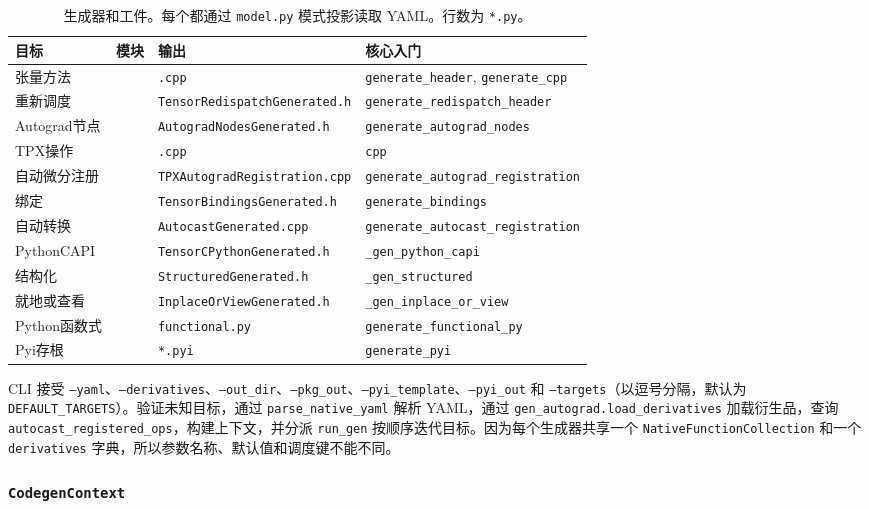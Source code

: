 \begin{table}[H]
\centering
\caption{生成器和工件。每个都通过 \texttt{model.py} 模式投影读取 YAML。行数为 \texttt{*.py}。}
\label{tab:codegen_generators}
\small
\begin{tabular}{llll}
\toprule
目标 & 模块 & 输出 & 核心入门 \\
\midrule
张量方法 &  & \texttt{.cpp} & \texttt{generate\_header}, \texttt{generate\_cpp} \\
重新调度 &  & \texttt{TensorRedispatchGenerated.h} & \texttt{generate\_redispatch\_header} \\
Autograd节点 &  & \texttt{AutogradNodesGenerated.h} & \texttt{generate\_autograd\_nodes} \\
TPX操作 &  & \texttt{.cpp} & \texttt{cpp} \\
自动微分注册 &  & \texttt{TPXAutogradRegistration.cpp} & \texttt{generate\_autograd\_registration} \\
绑定 &  & \texttt{TensorBindingsGenerated.h} & \texttt{generate\_bindings} \\
自动转换 &  & \texttt{AutocastGenerated.cpp} & \texttt{generate\_autocast\_registration} \\
PythonCAPI &  & \texttt{TensorCPythonGenerated.h} & \texttt{\_gen\_python\_capi} \\
结构化 &  & \texttt{StructuredGenerated.h} & \texttt{\_gen\_structured} \\
就地或查看 &  & \texttt{InplaceOrViewGenerated.h} & \texttt{\_gen\_inplace\_or\_view} \\
Python函数式 &  & \texttt{functional.py} & \texttt{generate\_functional\_py} \\
Pyi存根 &  & \texttt{*.pyi} & \texttt{generate\_pyi} \\
\bottomrule
\end{tabular}
\end{table}

CLI 接受 \texttt{--yaml}、\texttt{--derivatives}、\texttt{--out\_dir}、\texttt{--pkg\_out}、\texttt{--pyi\_template}、\texttt{--pyi\_out} 和 \texttt{--targets}（以逗号分隔，默认为 \texttt{DEFAULT\_TARGETS}）。验证未知目标，通过 \texttt{parse\_native\_yaml} 解析 YAML，通过 \texttt{gen\_autograd.load\_derivatives} 加载衍生品，查询 \texttt{autocast\_registered\_ops}，构建上下文，并分派 \texttt{run\_gen} 按顺序迭代目标。因为每个生成器共享一个 \texttt{NativeFunctionCollection} 和一个 \texttt{derivatives} 字典，所以参数名称、默认值和调度键不能不同。

\subsubsection{ \texttt{CodegenContext}}

